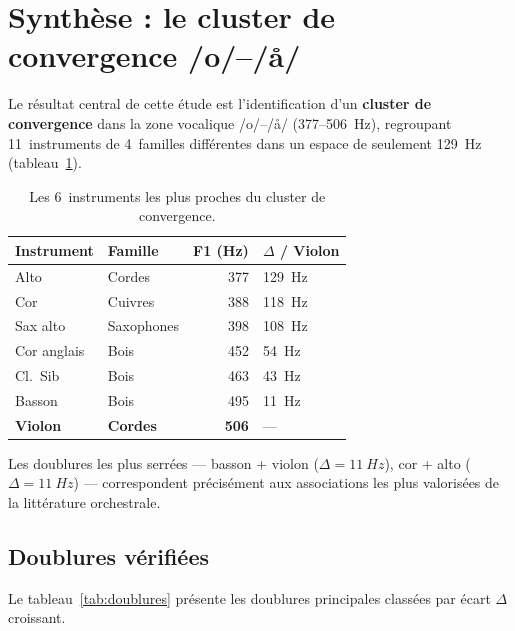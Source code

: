 \documentclass[11pt,a4paper]{article}
\begin{document}
\section{Synthèse : le cluster de convergence /o/--/\r{a}/}

Le résultat central de cette étude est l'identification d'un
\textbf{cluster de convergence} dans la zone vocalique /o/--/\r{a}/
(377--\SI{506}{Hz}), regroupant 11~instruments de 4~familles
différentes dans un espace de seulement \SI{129}{Hz}
(tableau~\ref{tab:cluster}).

\begin{table}[ht]
\centering
\caption{Les 6~instruments les plus proches du cluster de convergence.}
\label{tab:cluster}
\begin{tabular}{llrl}
\toprule
Instrument & Famille & F1 (Hz) & $\Delta$ / Violon \\
\midrule
Alto       & Cordes  & 377 & \SI{129}{Hz} \\
Cor        & Cuivres & 388 & \SI{118}{Hz} \\
Sax alto   & Saxophones & 398 & \SI{108}{Hz} \\
Cor anglais & Bois   & 452 & \SI{54}{Hz} \\
Cl.~Sib    & Bois   & 463 & \SI{43}{Hz} \\
Basson     & Bois   & 495 & \SI{11}{Hz} \\
\textbf{Violon} & \textbf{Cordes} & \textbf{506} & --- \\
\bottomrule
\end{tabular}
\end{table}

Les doublures les plus serrées --- basson + violon ($\Delta =
\SI{11}{Hz}$), cor + alto ($\Delta = \SI{11}{Hz}$) --- correspondent
précisément aux associations les plus valorisées de la littérature
orchestrale.

\subsection{Doublures vérifiées}

Le tableau~\ref{tab:doublures} présente les doublures principales
classées par écart $\Delta$ croissant.
\end{document}
